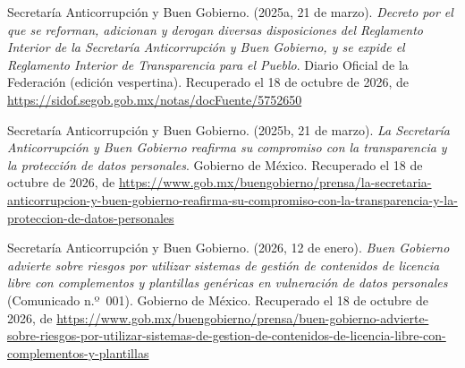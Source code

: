 \documentclass[12pt, a4paper]{article}
\begin{document}
\begin{list}{}{\setlength{\leftmargin}{1.27cm}\setlength{\itemindent}{-1.27cm}%
  \setlength{\labelwidth}{0pt}\setlength{\labelsep}{0pt}\setlength{\itemsep}{6pt}}
\item Secretaría Anticorrupción y Buen Gobierno. (2025a, 21 de
  marzo). \textit{Decreto por el que se reforman, adicionan y derogan diversas disposiciones del
  Reglamento Interior de la Secretaría Anticorrupción y Buen
  Gobierno, y se expide el Reglamento Interior de Transparencia para el Pueblo}. Diario Oficial de la Federación (edición vespertina).
Recuperado el 18 de octubre de 2026, de \url{https://sidof.segob.gob.mx/notas/docFuente/5752650}

\item Secretaría Anticorrupción y Buen Gobierno. (2025b,
  21 de marzo). \textit{La Secretaría Anticorrupción y Buen
  Gobierno reafirma su compromiso con la transparencia y la
  protección de datos personales}. Gobierno de México.
  Recuperado el 18 de octubre de 2026, de \url{https://www.gob.mx/buengobierno/prensa/la-secretaria-anticorrupcion-y-buen-gobierno-reafirma-su-compromiso-con-la-transparencia-y-la-proteccion-de-datos-personales}

\item Secretaría Anticorrupción y Buen Gobierno. (2026, 12 de enero).
  \textit{Buen Gobierno advierte sobre riesgos por utilizar sistemas de
  gestión de contenidos de licencia libre con complementos y plantillas
  genéricas en vulneración de datos personales} (Comunicado n.º~001).
  Gobierno de México. Recuperado el 18 de octubre de 2026, de \url{https://www.gob.mx/buengobierno/prensa/buen-gobierno-advierte-sobre-riesgos-por-utilizar-sistemas-de-gestion-de-contenidos-de-licencia-libre-con-complementos-y-plantillas}
 
 

\end{list}
\end{document}
